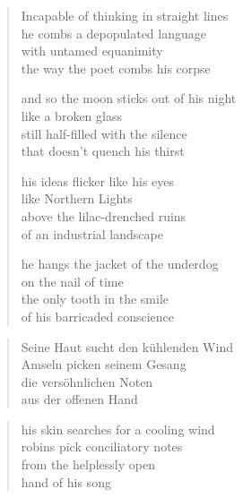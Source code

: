 \begin{verse}

Incapable of thinking in straight lines\\
he combs a depopulated language\\
with untamed equanimity\\
the way the poet combs his corpse

and so the moon sticks out of his night\\
like a broken glass\\
still half-filled with the silence\\
that doesn't quench his thirst

his ideas flicker like his eyes\\
like Northern Lights\\
above the lilac-drenched ruins\\
of an industrial landscape

he hangs the jacket of the underdog\\
on the nail of time\\
the only tooth in the smile\\
of his barricaded conscience

\end{verse}

\clearpage

\begin{verse}

Seine Haut sucht den kühlenden Wind\\
Amseln picken seinem Gesang\\
die versöhnlichen Noten\\
aus der offenen Hand

\end{verse}

\clearpage

\begin{verse}
his skin searches for a cooling wind\\
robins pick conciliatory notes\\
from the helplessly open\\
hand of his song

\end{verse}
